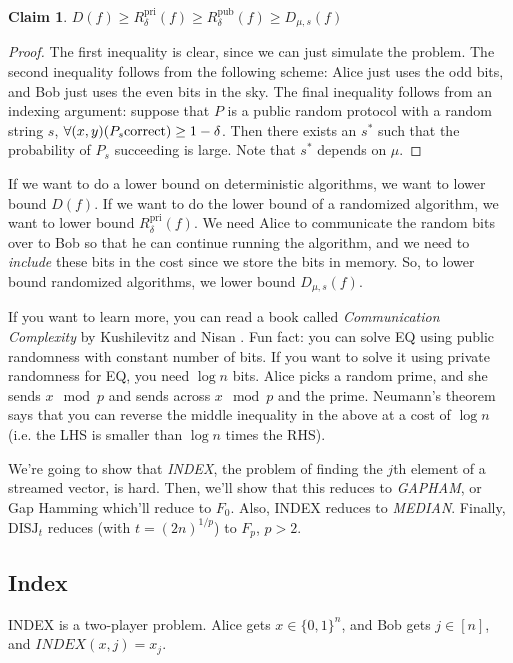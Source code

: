 \documentclass[11pt]{article}
\let\Pr\relax
\DeclareMathOperator*{\Pr}{\mathbb{P}}
\newtheorem{claim}[theorem]{Claim}
\newcommand{\on}{\operatorname}
\begin{document}
\smallskip

\begin{claim}
  $D(f) \geq R^{\on{pri}}_\delta(f) \geq R^{\on{pub}}_\delta(f) \geq D_{\mu, s}(f)$
\end{claim}

\begin{proof}
  The first inequality is clear, since we can just simulate the problem. The second inequality follows from the following scheme: Alice just uses the odd bits, and Bob just uses the even bits in the sky. The final inequality follows from an indexing argument: suppose that $P$ is a public random protocol with a random string $s$, $\forall (x, y) \Pr(P_s \text{correct}) \geq 1 - \delta$. Then there exists an $s^*$ such that the probability of $P_s$ succeeding is large. Note that $s^*$ depends on $\mu$.
\end{proof}

If we want to do a lower bound on deterministic algorithms, we want to lower bound $D(f)$. If we want to do the lower bound of a randomized algorithm, we want to lower bound $R^{\on{pri}}_\delta(f)$. We need Alice to communicate the random bits over to Bob so that he can continue running the algorithm, and we need to \emph{include} these bits in the cost since we store the bits in memory. So, to lower bound randomized algorithms, we lower bound $D_{\mu, s}(f)$. 

\smallskip

If you want to learn more, you can read a book called \emph{Communication Complexity} by Kushilevitz and Nisan \cite{kushi2006}. Fun fact: you can solve EQ using public randomness with constant number of bits. If you want to solve it using private randomness for EQ, you need $\log n$ bits. Alice picks a random prime, and she sends $x \mod p$ and sends across $x \mod p$ and the prime. Neumann's theorem says that you can reverse the middle inequality in the above at a cost of $\log n$ (i.e. the LHS is smaller than $\log n$ times the RHS).

\smallskip

We're going to show that \emph{INDEX}, the problem of finding the $j$th element of a streamed vector, is hard. Then, we'll show that this reduces to \emph{GAPHAM}, or Gap Hamming which'll reduce to $F_0$. Also, INDEX reduces to \emph{MEDIAN}. Finally, \emph{$\text{DISJ}_t$} reduces (with $t = (2n)^{1/p}$) to $F_p$, $p > 2$.

\smallskip

\subsection{Index}
INDEX is a two-player problem. Alice gets $x \in \{0, 1\}^n$, and Bob gets $j \in [n]$, and $INDEX(x, j) = x_j$. 
\end{document}
